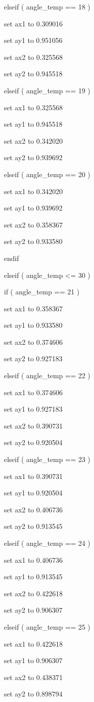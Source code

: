 \documentclass[
]{article}
\begin{document}
elseif ( angle\_temp == 18 )

set ax1 to 0.309016

set ay1 to 0.951056

set ax2 to 0.325568

set ay2 to 0.945518

elseif ( angle\_temp == 19 )

set ax1 to 0.325568

set ay1 to 0.945518

set ax2 to 0.342020

set ay2 to 0.939692

elseif ( angle\_temp == 20 )

set ax1 to 0.342020

set ay1 to 0.939692

set ax2 to 0.358367

set ay2 to 0.933580

endif

elseif ( angle\_temp \textless= 30 )

if ( angle\_temp == 21 )

set ax1 to 0.358367

set ay1 to 0.933580

set ax2 to 0.374606

set ay2 to 0.927183

elseif ( angle\_temp == 22 )

set ax1 to 0.374606

set ay1 to 0.927183

set ax2 to 0.390731

set ay2 to 0.920504

elseif ( angle\_temp == 23 )

set ax1 to 0.390731

set ay1 to 0.920504

set ax2 to 0.406736

set ay2 to 0.913545

elseif ( angle\_temp == 24 )

set ax1 to 0.406736

set ay1 to 0.913545

set ax2 to 0.422618

set ay2 to 0.906307

elseif ( angle\_temp == 25 )

set ax1 to 0.422618

set ay1 to 0.906307

set ax2 to 0.438371

set ay2 to 0.898794
\end{document}
